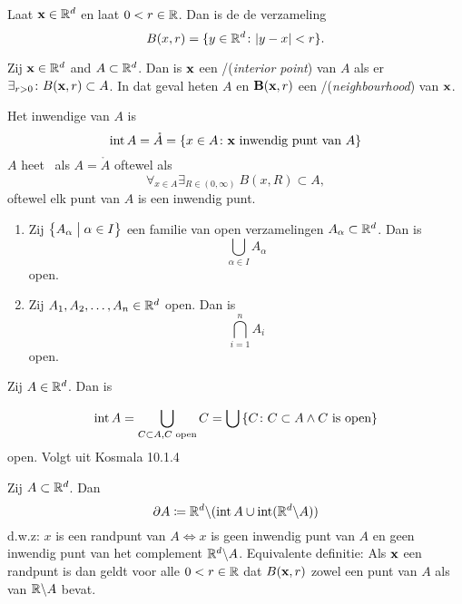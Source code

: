 \documentclass{2wa40summary}
\begin{document}
	\begin{define}[Bol]
		Laat ${\textbf{x}}\in\mathbb{R}^d$ en laat $0<r\in\mathbb{R}$. Dan is de  de verzameling
		\[
		B(x,r)=\lbrace y \in \mathbb{R}^d \colon {\left|y-x\right|}<r\rbrace.
		\]
		
	\end{define}
	\begin{define} Zij ${\textbf{x}} \in \mathbb{R}^d$ and $A \subset \mathbb{R}^d$. Dan is ${\textbf{x}}$ een
		/(\textit{interior point}) van $A$
		als er $\exists_{r>0}\colon B({\textbf{x}},r) \subset A$.
		In dat geval heten $A$ en ${\textbf{B}}({\textbf{x}},r)$ een /(\textit{neighbourhood}) van ${\textbf{x}}$.
	\end{define}
	\begin{define}
		Het inwendige van $A$ is
		\[\operatorname{\mathop{int}} A=\mathring{A}=\left\lbrace x \in A \colon {\textbf{x}} \text{ inwendig punt van } A\right\rbrace\]
		$A$ heet \ als $A=\mathring{A}$ oftewel als
		\[
		\forall _{x \in A} \exists _{R \in (0,\infty)}\: B(x,R) \subset A,
		\]
		oftewel elk punt van $A$ is een inwendig punt.
	\end{define}
	\begin{theorem}
		\begin{enumerate}[(1)]
			\item Zij $\left\lbrace A_\alpha \bigm| \alpha \in I \right\rbrace$ een familie van open verzamelingen $A_\alpha \subset \mathbb{R}^d$. Dan is
			\[
			\bigcup_{\alpha \in I}A_\alpha
			\]
			open.
			\item Zij $A_1,A_2,\dots,A_n \in \mathbb{R}^d$ open. Dan is
			\[
			\bigcap_{i=1}^{n}A_i
			\]
			open.
		\end{enumerate}
	\end{theorem}
	\begin{theorem}[Open]
		Zij $A\in\mathbb{R}^d$. Dan is
		\item \[\operatorname{\mathop{int}} A=\bigcup_{C \subset A, C \text{ open} }C=\bigcup \left\lbrace C \colon C \subset A \wedge C \text{ is open}\right\rbrace\]
		open. Volgt uit Kosmala 10.1.4
	\end{theorem}
	\begin{define}[Rand]
		Zij $A \subset \mathbb{R}^d$. Dan
		\[\partial A\coloneqq  \mathbb{R}^d\backslash (\operatorname{\mathop{int}} A \cup \operatorname{\mathop{int}} (\mathbb{R}^d\backslash A))\]
		d.w.z: $x$ is een randpunt van $A \iff x$ is geen inwendig punt van $A$ en geen inwendig punt van het complement $\mathbb{R}^d\backslash A$.
		Equivalente definitie: Als ${\textbf{x}}$ een randpunt is dan geldt voor alle $0<r\in\mathbb{R}$ dat
		$B({\textbf{x}},r)$ zowel een punt van $A$ als van $\mathbb{R}\backslash A$ bevat.
	\end{define}
\end{document}
